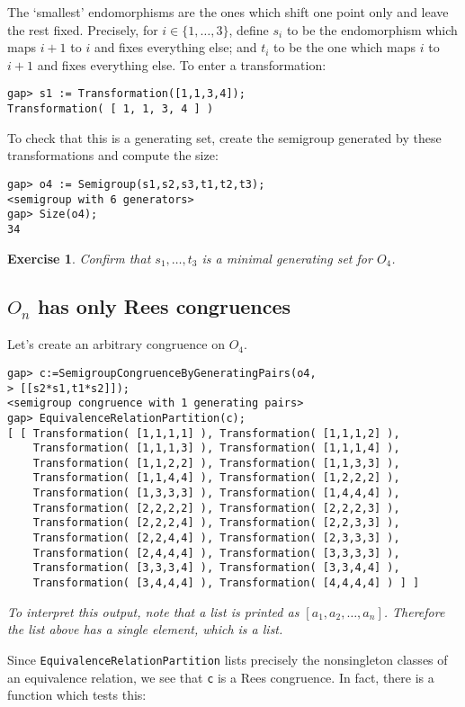 \documentclass{ws-p8-50x6-00}
\theoremstyle{plain} \newtheorem{Thm}{Theorem}
\theoremstyle{plain} \newtheorem{Cor}{Corollary}
\theoremstyle{plain} \newtheorem{Lemma}{Lemma}
\theoremstyle{plain} \newtheorem{Prop}{Proposition}
\theoremstyle{plain} \newtheorem{Ex}{Exercise}
\begin{document}
The `smallest' endomorphisms are the ones 
which shift one point only and leave the rest fixed. Precisely,
for $i \in \{1, \ldots, 3\}$, define 
$s_i$ to be the endomorphism  which maps $i+1$ to $i$ and 
fixes everything else; and $t_i$ to be the one which maps 
$i$ to $i+1$ and fixes everything
else.  To enter a transformation: 
\begin{verbatim}
gap> s1 := Transformation([1,1,3,4]);
Transformation( [ 1, 1, 3, 4 ] )
\end{verbatim}

To check that this is a generating set,
create the semigroup generated by these transformations
and compute the size:
\begin{verbatim}
gap> o4 := Semigroup(s1,s2,s3,t1,t2,t3);
<semigroup with 6 generators>
gap> Size(o4);
34
\end{verbatim}
\begin{Ex}
Confirm that $s_1, \ldots, t_3$ is a minimal generating set for $O_4$.
\end{Ex}


\subsection{$O_n$ has only Rees congruences}
Let's create an arbitrary congruence on $O_4$.
\begin{verbatim}
gap> c:=SemigroupCongruenceByGeneratingPairs(o4,
> [[s2*s1,t1*s2]]);
<semigroup congruence with 1 generating pairs>
gap> EquivalenceRelationPartition(c);
[ [ Transformation( [1,1,1,1] ), Transformation( [1,1,1,2] ), 
    Transformation( [1,1,1,3] ), Transformation( [1,1,1,4] ), 
    Transformation( [1,1,2,2] ), Transformation( [1,1,3,3] ), 
    Transformation( [1,1,4,4] ), Transformation( [1,2,2,2] ), 
    Transformation( [1,3,3,3] ), Transformation( [1,4,4,4] ), 
    Transformation( [2,2,2,2] ), Transformation( [2,2,2,3] ), 
    Transformation( [2,2,2,4] ), Transformation( [2,2,3,3] ), 
    Transformation( [2,2,4,4] ), Transformation( [2,3,3,3] ), 
    Transformation( [2,4,4,4] ), Transformation( [3,3,3,3] ), 
    Transformation( [3,3,3,4] ), Transformation( [3,3,4,4] ), 
    Transformation( [3,4,4,4] ), Transformation( [4,4,4,4] ) ] ]
\end{verbatim}
{\em To interpret this output, note that  a list is printed as 
$[a_1, a_2, \ldots, a_n]$. Therefore the list above has a single
element, which is a list.}

Since {\tt EquivalenceRelationPartition} lists precisely the  nonsingleton
classes of an equivalence relation, we see that {\tt c} is a Rees congruence.
In fact, there is a function which tests this:
\end{document}
